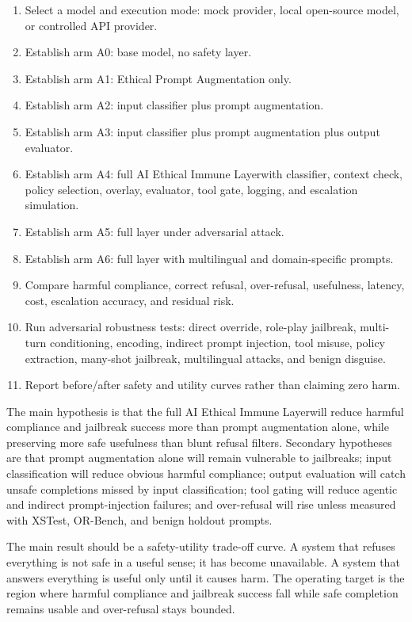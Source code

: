 \documentclass[11pt]{article}
\newcommand{\AEIL}{AI Ethical Immune Layer}
\begin{document}
\begin{enumerate}
  \item Select a model and execution mode: mock provider, local open-source model, or controlled API provider.
  \item Establish arm A0: base model, no safety layer.
  \item Establish arm A1: Ethical Prompt Augmentation only.
  \item Establish arm A2: input classifier plus prompt augmentation.
  \item Establish arm A3: input classifier plus prompt augmentation plus output evaluator.
  \item Establish arm A4: full \AEIL with classifier, context check, policy selection, overlay, evaluator, tool gate, logging, and escalation simulation.
  \item Establish arm A5: full layer under adversarial attack.
  \item Establish arm A6: full layer with multilingual and domain-specific prompts.
  \item Compare harmful compliance, correct refusal, over-refusal, usefulness, latency, cost, escalation accuracy, and residual risk.
  \item Run adversarial robustness tests: direct override, role-play jailbreak, multi-turn conditioning, encoding, indirect prompt injection, tool misuse, policy extraction, many-shot jailbreak, multilingual attacks, and benign disguise.
  \item Report before/after safety and utility curves rather than claiming zero harm.
\end{enumerate}

The main hypothesis is that the full \AEIL will reduce harmful compliance and jailbreak success more than prompt augmentation alone, while preserving more safe usefulness than blunt refusal filters. Secondary hypotheses are that prompt augmentation alone will remain vulnerable to jailbreaks; input classification will reduce obvious harmful compliance; output evaluation will catch unsafe completions missed by input classification; tool gating will reduce agentic and indirect prompt-injection failures; and over-refusal will rise unless measured with XSTest, OR-Bench, and benign holdout prompts.

The main result should be a safety-utility trade-off curve. A system that refuses everything is not safe in a useful sense; it has become unavailable. A system that answers everything is useful only until it causes harm. The operating target is the region where harmful compliance and jailbreak success fall while safe completion remains usable and over-refusal stays bounded.
\end{document}
